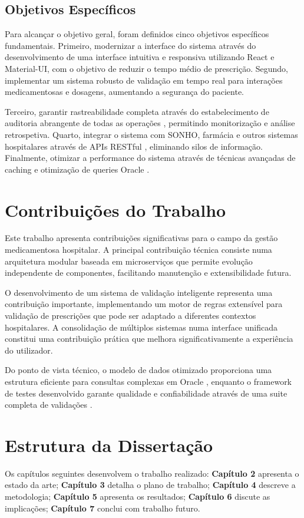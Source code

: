 \subsection{Objetivos Específicos}

Para alcançar o objetivo geral, foram definidos cinco objetivos específicos fundamentais. Primeiro, modernizar a interface do sistema através do desenvolvimento de uma interface intuitiva e responsiva utilizando React \cite{misra2023} e Material-UI, com o objetivo de reduzir o tempo médio de prescrição. Segundo, implementar um sistema robusto de validação em tempo real para interações medicamentosas \cite{moss2015,belle2013} e dosagens, aumentando a segurança do paciente.

Terceiro, garantir rastreabilidade completa através do estabelecimento de auditoria abrangente de todas as operações \cite{european2016}, permitindo monitorização e análise retrospetiva. Quarto, integrar o sistema com SONHO, farmácia e outros sistemas hospitalares através de APIs RESTful \cite{mandl2020}, eliminando silos de informação. Finalmente, otimizar a performance do sistema através de técnicas avançadas de caching e otimização de queries Oracle \cite{jiang2014}.

\section{Contribuições do Trabalho}

Este trabalho apresenta contribuições significativas para o campo da gestão medicamentosa hospitalar. A principal contribuição técnica consiste numa arquitetura modular baseada em microserviços \cite{newman2021} que permite evolução independente de componentes, facilitando manutenção e extensibilidade futura. 

O desenvolvimento de um sistema de validação inteligente representa uma contribuição importante, implementando um motor de regras extensível para validação de prescrições \cite{amland2019} que pode ser adaptado a diferentes contextos hospitalares. A consolidação de múltiplos sistemas numa interface unificada \cite{bowles2020} constitui uma contribuição prática que melhora significativamente a experiência do utilizador.

Do ponto de vista técnico, o modelo de dados otimizado proporciona uma estrutura eficiente para consultas complexas em Oracle \cite{lin2018}, enquanto o framework de testes desenvolvido garante qualidade e confiabilidade através de uma suite completa de validações \cite{martin2017}.


\section{Estrutura da Dissertação}

Os capítulos seguintes desenvolvem o trabalho realizado:
\textbf{Capítulo 2} apresenta o estado da arte;
\textbf{Capítulo 3} detalha o plano de trabalho;
\textbf{Capítulo 4} descreve a metodologia;
\textbf{Capítulo 5} apresenta os resultados;
\textbf{Capítulo 6} discute as implicações;
\textbf{Capítulo 7} conclui com trabalho futuro. 